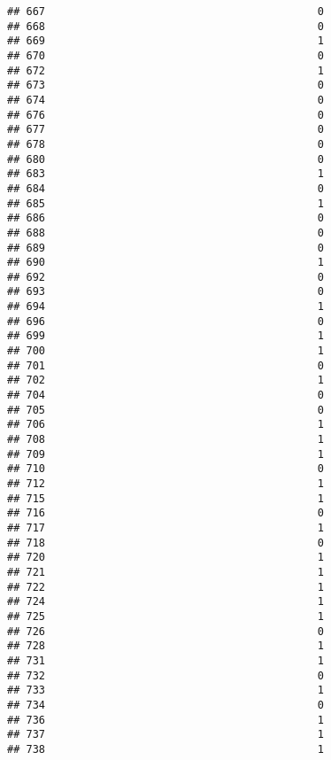 \documentclass[
]{article}
\begin{document}
\begin{verbatim}
## 667                                           0
## 668                                           0
## 669                                           1
## 670                                           0
## 672                                           1
## 673                                           0
## 674                                           0
## 676                                           0
## 677                                           0
## 678                                           0
## 680                                           0
## 683                                           1
## 684                                           0
## 685                                           1
## 686                                           0
## 688                                           0
## 689                                           0
## 690                                           1
## 692                                           0
## 693                                           0
## 694                                           1
## 696                                           0
## 699                                           1
## 700                                           1
## 701                                           0
## 702                                           1
## 704                                           0
## 705                                           0
## 706                                           1
## 708                                           1
## 709                                           1
## 710                                           0
## 712                                           1
## 715                                           1
## 716                                           0
## 717                                           1
## 718                                           0
## 720                                           1
## 721                                           1
## 722                                           1
## 724                                           1
## 725                                           1
## 726                                           0
## 728                                           1
## 731                                           1
## 732                                           0
## 733                                           1
## 734                                           0
## 736                                           1
## 737                                           1
## 738                                           1

\end{verbatim}
\end{document}
